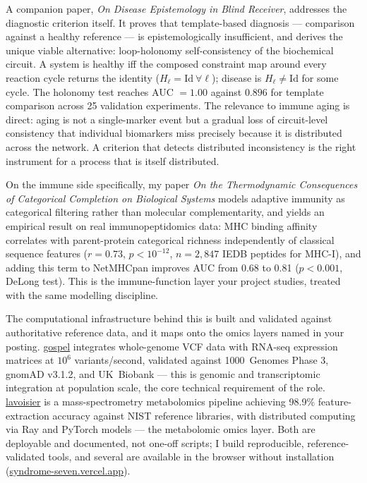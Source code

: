 \documentclass[12pt,a4paper]{article}
\begin{document}
A companion paper, \textit{On Disease Epistemology in Blind Receiver}, addresses
the diagnostic criterion itself. It proves that template-based diagnosis ---
comparison against a healthy reference --- is epistemologically insufficient, and
derives the unique viable alternative: loop-holonomy self-consistency of the
biochemical circuit. A system is healthy iff the composed constraint map around
every reaction cycle returns the identity ($H_\ell=\mathrm{Id}\ \forall\ell$);
disease is $H_\ell\neq\mathrm{Id}$ for some cycle. The holonomy test reaches
AUC $=1.00$ against $0.896$ for template comparison across 25 validation
experiments. The relevance to immune aging is direct: aging is not a single-marker
event but a gradual loss of circuit-level consistency that individual biomarkers
miss precisely because it is distributed across the network. A criterion that
detects distributed inconsistency is the right instrument for a process that is
itself distributed.

On the immune side specifically, my paper \textit{On the Thermodynamic
Consequences of Categorical Completion on Biological Systems} models adaptive
immunity as categorical filtering rather than molecular complementarity, and
yields an empirical result on real immunopeptidomics data: MHC binding affinity
correlates with parent-protein categorical richness independently of classical
sequence features ($r=0.73$, $p<10^{-12}$, $n=2{,}847$ IEDB peptides for MHC-I),
and adding this term to NetMHCpan improves AUC from 0.68 to 0.81 ($p<0.001$,
DeLong test). This is the immune-function layer your project studies, treated
with the same modelling discipline.

The computational infrastructure behind this is built and validated against
authoritative reference data, and it maps onto the omics layers named in your
posting. \href{https://github.com/fullscreen-triangle/gospel}{gospel} integrates
whole-genome VCF data with RNA-seq expression matrices at $10^6$ variants/second,
validated against 1000~Genomes Phase 3, gnomAD v3.1.2, and UK~Biobank --- this is
genomic and transcriptomic integration at population scale, the core technical
requirement of the role.
\href{https://github.com/fullscreen-triangle/lavoisier}{lavoisier} is a
mass-spectrometry metabolomics pipeline achieving 98.9\% feature-extraction
accuracy against NIST reference libraries, with distributed computing via Ray and
PyTorch models --- the metabolomic omics layer. Both are deployable and
documented, not one-off scripts; I build reproducible, reference-validated tools,
and several are available in the browser without installation
(\href{https://syndrome-seven.vercel.app/tools}{syndrome-seven.vercel.app}).
\end{document}
